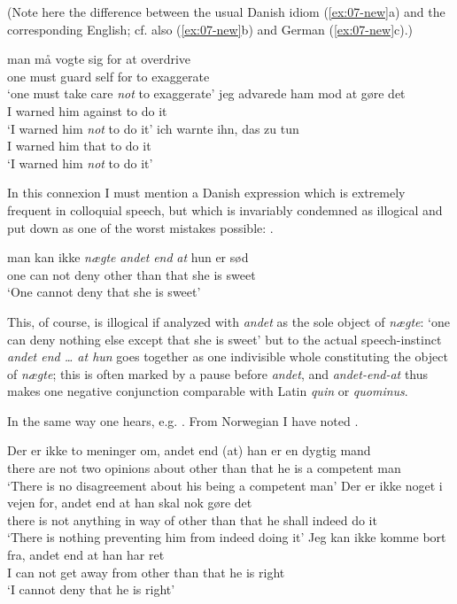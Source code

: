 (Note here the difference between the usual Danish idiom (\ref{ex:07-new}a) and the corresponding English; cf. also (\ref{ex:07-new}b) and German (\ref{ex:07-new}c).)

\ea\label{ex:07-new}
\ea
\gll man må vogte sig for at overdrive\\
    one must guard self for to exaggerate\\
\glt `one must take care \emph{not} to exaggerate'
\ex
\gll jeg advarede ham mod at gøre det\\
    I warned him against to do it\\
\glt `I warned him \emph{not} to do it'
\ex
\gll ich warnte ihn, das zu tun\\
    I warned him that to do it\\
\glt `I warned him \emph{not} to do it'
\z
\z


In this connexion I must mention a Danish expression which is extremely frequent in colloquial speech, but which is invariably condemned as illogical and put down as one of the worst mistakes possible: . 

\ea \label{ex:07-81}
\gll man kan ikke \emph{nægte} \emph{andet} \emph{end} \emph{at} hun er sød\\
one can not deny other than that she is sweet\\
\glt `One cannot deny that she is sweet'
\z

\noindent This, of course, is illogical if analyzed with \textit{andet} as the sole object of \textit{nægte}: `one can deny nothing else except that she is sweet' but to the actual speech-instinct \textit{andet end {\dots} at hun} goes together as one indivisible whole constituting the object of \textit{nægte}; this is often marked by a pause before \textit{andet}, and \textit{andet-end-at} thus makes one negative conjunction comparable with Latin \textit{quin} or \textit{quominus}.

In the same way one hears, e.g. . From Norwegian I have noted .

\ea \label{ex:07-82}
\ea
\gll Der er ikke to meninger om, andet end (at) han er en dygtig mand\\
 there are not two opinions about other than that he is a competent man\\
\glt `There is no disagreement about his being a competent man' %
\ex
\gll Der er ikke noget i vejen for, andet end at han skal nok gøre det\\
 there is not anything in way of other than that he shall indeed do it\\
\glt `There is nothing preventing him from indeed doing it'
\ex 
\gll Jeg kan ikke komme bort fra, andet end at han har ret\\
 I can not get away from other than that he is right\\
\glt `I cannot deny that he is right'
\z
\z

